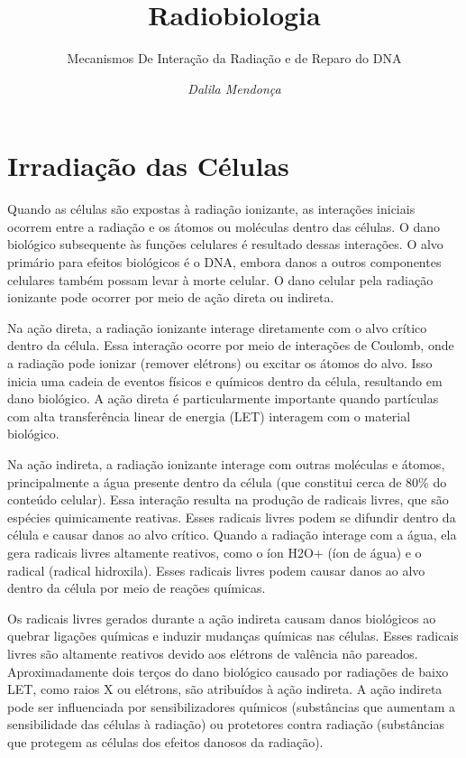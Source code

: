\documentclass[11pt,a4paper]{article}
\title{\LobsterTwo\Huge{Radiobiologia}}
\author{\LobsterTwo\Large{Mecanismos De Interação da Radiação e de Reparo do DNA}\nocite{*}}
\date{\LobsterTwo\textit{Dalila Mendonça}}
\begin{document}
	\maketitle


\section{Irradiação das Células}

	Quando as células são expostas à radiação ionizante, as interações iniciais ocorrem entre a radiação e os átomos ou moléculas dentro das células. O dano biológico subsequente às funções celulares é resultado dessas interações. O alvo primário para efeitos biológicos é o DNA, embora danos a outros componentes celulares também possam levar à morte celular. O dano celular pela radiação ionizante pode ocorrer por meio de ação direta ou indireta.

	Na ação direta, a radiação ionizante interage diretamente com o alvo crítico dentro da célula. Essa interação ocorre por meio de interações de Coulomb, onde a radiação pode ionizar (remover elétrons) ou excitar os átomos do alvo. Isso inicia uma cadeia de eventos físicos e químicos dentro da célula, resultando em dano biológico. A ação direta é particularmente importante quando partículas com alta transferência linear de energia (LET) interagem com o material biológico.

	Na ação indireta, a radiação ionizante interage com outras moléculas e átomos, principalmente a água presente dentro da célula (que constitui cerca de 80\% do conteúdo celular). Essa interação resulta na produção de radicais livres, que são espécies quimicamente reativas. Esses radicais livres podem se difundir dentro da célula e causar danos ao alvo crítico. Quando a radiação interage com a água, ela gera radicais livres altamente reativos, como o íon H2O+ (íon de água) e o radical  (radical hidroxila). Esses radicais livres podem causar danos ao alvo dentro da célula por meio de reações químicas.

	Os radicais livres gerados durante a ação indireta causam danos biológicos ao quebrar ligações químicas e induzir mudanças químicas nas células. Esses radicais livres são altamente reativos devido aos elétrons de valência não pareados. Aproximadamente dois terços do dano biológico causado por radiações de baixo LET, como raios X ou elétrons, são atribuídos à ação indireta. A ação indireta pode ser influenciada por sensibilizadores químicos (substâncias que aumentam a sensibilidade das células à radiação) ou protetores contra radiação (substâncias que protegem as células dos efeitos danosos da radiação).
\end{document}
